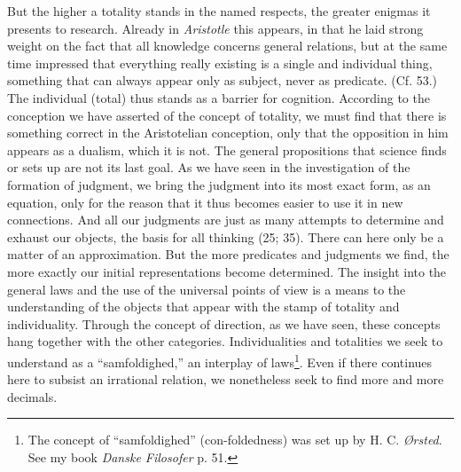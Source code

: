 \documentclass[12pt,a4paper]{book}
\newcommand{\opage}[1]{\marginnote{\footnotesize\textit{[#1]}}}
\begin{document}
But the higher a totality stands in the named respects, the greater enigmas it
presents to research. Already in \emph{Aristotle} this appears, in that he
laid strong weight on the fact that all knowledge concerns general relations,
but at the same time impressed that everything really existing is a single and
individual thing, something that can always appear only as subject, \opage{224}never as
predicate. (Cf. 53.) The individual (total) thus stands as a barrier for
cognition. According to the conception we have asserted of the concept of
totality, we must find that there is something correct in the Aristotelian
conception, only that the opposition in him appears as a dualism, which it is
not. The general propositions that science finds or sets up are not its last
goal. As we have seen in the investigation of the formation of judgment, we
bring the judgment into its most exact form, as an equation, only for the
reason that it thus becomes easier to use it in new connections. And all our
judgments are just as many attempts to determine and exhaust our objects, the
basis for all thinking (25; 35). There can here only be a matter of an
approximation. But the more predicates and judgments we find, the more exactly
our initial representations become determined. The insight into the general
laws and the use of the universal points of view is a means to the
understanding of the objects that appear with the stamp of totality and
individuality. Through the concept of direction, as we have seen, these
concepts hang together with the other categories. Individualities and
totalities we seek to understand as a ``samfoldighed,'' an interplay of
laws\footnote{The concept of ``samfoldighed'' (con-foldedness) was set up by
H. C. \emph{Ørsted}. See my book \emph{Danske Filosofer} p. 51.}. Even if
there continues here to subsist an irrational relation, we nonetheless seek to
find more and more decimals.
\end{document}
